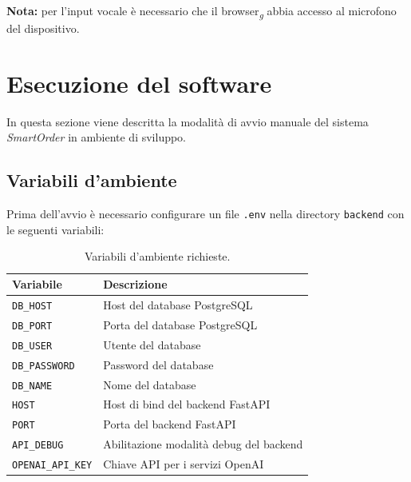 \documentclass[a4paper, 11pt, oneside]{scrartcl}
\begin{document}
\textbf{Nota:} per l'input vocale \`e necessario che il browser\textsubscript{\textit{g}} abbia accesso al microfono del dispositivo.


\newpage
\section{Esecuzione del software}

In questa sezione viene descritta la modalit\`a di avvio manuale del sistema \textit{SmartOrder} in ambiente di sviluppo.

\subsection{Variabili d'ambiente}

Prima dell'avvio \`e necessario configurare un file \texttt{.env} nella directory \texttt{backend} con le seguenti variabili:

\begin{table}[H]
    \centering
    \renewcommand{\arraystretch}{1.2}
    \begin{tabularx}{\textwidth}{@{}p{4.5cm}X@{}}
        \toprule
        \textbf{Variabile}        & \textbf{Descrizione}                      \\
        \midrule
        \texttt{DB\_HOST}         & Host del database PostgreSQL              \\
        \texttt{DB\_PORT}         & Porta del database PostgreSQL             \\
        \texttt{DB\_USER}         & Utente del database                       \\
        \texttt{DB\_PASSWORD}     & Password del database                     \\
        \texttt{DB\_NAME}         & Nome del database                         \\
        \texttt{HOST}             & Host di bind del backend FastAPI          \\
        \texttt{PORT}             & Porta del backend FastAPI                 \\
        \texttt{API\_DEBUG}       & Abilitazione modalit\`a debug del backend \\
        \texttt{OPENAI\_API\_KEY} & Chiave API per i servizi OpenAI           \\
        \bottomrule
    \end{tabularx}
    \caption{Variabili d'ambiente richieste.}
\end{table}
\end{document}
